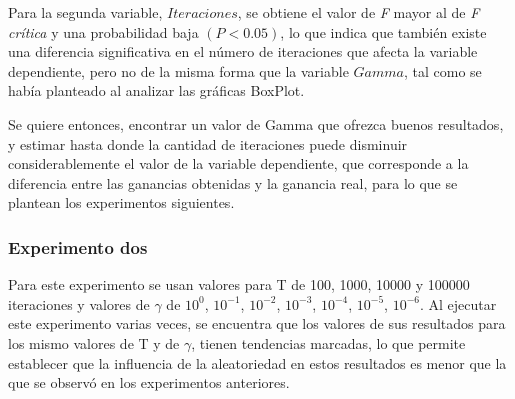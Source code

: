 Para la segunda variable, $Iteraciones$, se obtiene el valor de \textit{F} mayor al de \textit{F crítica} y una probabilidad baja $(P<0.05)$, lo que indica que también existe una diferencia significativa en el número de iteraciones que afecta la variable dependiente, pero no de la misma forma que la variable $Gamma$, tal como se había planteado al analizar las gráficas BoxPlot.

Se quiere entonces, encontrar un valor de Gamma que ofrezca buenos resultados, y estimar hasta donde la cantidad de iteraciones puede disminuir considerablemente el valor de la variable dependiente, que corresponde a la diferencia entre las ganancias obtenidas y la ganancia real, para lo que se plantean los experimentos siguientes.

\subsubsection{Experimento dos}


 Para este experimento se usan valores para T de 100, 1000, 10000 y 100000 iteraciones y valores de $\gamma$ de $10^{0}$, $10^{-1}$, $10^{-2}$, $10^{-3}$, $10^{-4}$, $10^{-5}$, $10^{-6}$. Al ejecutar este experimento varias veces, se encuentra que los valores de sus resultados para los mismo valores de T y de $\gamma$, tienen tendencias marcadas, lo que permite establecer que la influencia de la aleatoriedad en estos resultados es menor que la que se observó en los experimentos anteriores. 

